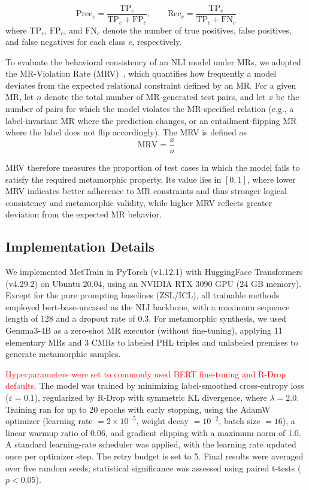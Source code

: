 \documentclass[lettersize,journal]{IEEEtran}
\newcommand{\red}[1]{\textcolor{red}{#1}}
\begin{document}
\begin{equation}
	\text{Prec}_c = \frac{\text{TP}_c}{\text{TP}_c + \text{FP}_c}, \qquad
	\text{Rec}_c = \frac{\text{TP}_c}{\text{TP}_c + \text{FN}_c}
\end{equation}
where $\text{TP}_c$, $\text{FP}_c$, and $\text{FN}_c$ denote the number of true positives, false positives, and false negatives for each class $c$, respectively.

To evaluate the behavioral consistency of an NLI model under MRs,
we adopted the MR-Violation Rate (MRV)~\cite{9700284}, which quantifies how frequently a model deviates
from the expected relational constraint defined by an MR.  
For a given MR, let $n$ denote the total number of MR-generated test pairs, and let $x$ be the
number of pairs for which the model violates the MR-specified relation (e.g., a
label-invariant MR where the prediction changes, or an entailment-flipping MR where
the label does not flip accordingly). The MRV is defined as
\begin{equation}
	\text{MRV} = \frac{x}{n}
\end{equation}

MRV therefore measures the proportion of test cases in which the model fails to satisfy the
required metamorphic property. Its value lies in $[0,1]$, where lower MRV indicates better
adherence to MR constraints and thus stronger logical consistency and metamorphic validity, while higher
MRV reflects greater deviation from the expected MR behavior.

\subsection{Implementation Details}
We implemented MetTrain in PyTorch (v1.12.1) with HuggingFace Transformers (v4.29.2) on Ubuntu 20.04, using an NVIDIA RTX 3090 GPU (24 GB memory). Except for the pure prompting baselines (ZSL/ICL), all trainable methods employed bert-base-uncased as the NLI backbone, with a maximum sequence length of 128 and a dropout rate of 0.3. For metamorphic synthesis, we used Gemma3-4B as a zero-shot MR executor (without fine-tuning), applying 11 elementary MRs and 3 CMRs to labeled PHL triples and unlabeled premises to generate metamorphic samples.

\red{Hyperparameters were set to commonly used BERT fine-tuning and R-Drop defaults.} The model was trained by minimizing label-smoothed cross-entropy loss ($\varepsilon = 0.1$), regularized by R-Drop with symmetric KL divergence, where $\lambda = 2.0$. Training ran for up to 20 epochs with early stopping, using the AdamW optimizer (learning rate $= 2 \times 10^{-5}$, weight decay $= 10^{-2}$, batch size $= 16$), a linear warmup ratio of 0.06, and gradient clipping with a maximum norm of 1.0. A standard learning-rate scheduler was applied, with the learning rate updated once per optimizer step. The retry budget is set to 5. Final results were averaged over five random seeds; statistical significance was assessed using paired t-tests ($p < 0.05$).
\end{document}
